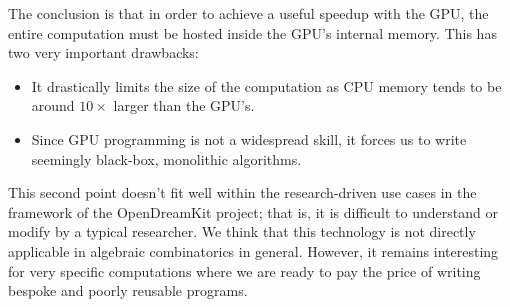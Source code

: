 \documentclass{deliverablereport}
\newcommand{\NN}{\mathbb{N}}
\begin{document}
The conclusion is that in order to achieve a useful speedup with the GPU, the entire computation
must be hosted inside the GPU's internal memory. This has two very important drawbacks:
\begin{itemize}
\item It drastically limits the size of the computation as CPU memory tends to
  be around $10\times$ larger than the GPU's.
\item Since GPU programming is not a widespread skill, it forces us to write
  seemingly black-box, monolithic algorithms.
\end{itemize}
This second point doesn't fit well within the research-driven use cases
in the framework of the OpenDreamKit project; that is, it is difficult to understand
or modify by a typical researcher. %
We think that this technology is not directly applicable in algebraic combinatorics
in general. However, it remains interesting
for very specific computations where we are ready to pay the price of writing
bespoke and poorly reusable programs.






\end{document}
